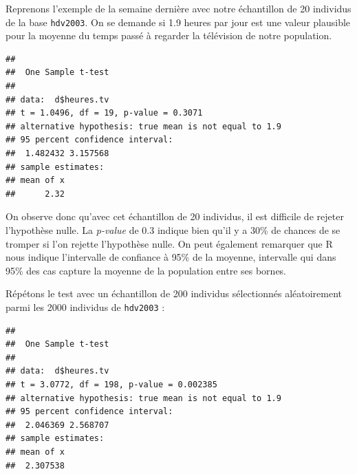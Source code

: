 \documentclass[
]{book}
\newenvironment{Shaded}{\begin{snugshade}}{\end{snugshade}}
\newcommand{\AttributeTok}[1]{\textcolor[rgb]{0.77,0.63,0.00}{#1}}
\newcommand{\FloatTok}[1]{\textcolor[rgb]{0.00,0.00,0.81}{#1}}
\newcommand{\FunctionTok}[1]{\textcolor[rgb]{0.00,0.00,0.00}{#1}}
\newcommand{\NormalTok}[1]{#1}
\newcommand{\OtherTok}[1]{\textcolor[rgb]{0.56,0.35,0.01}{#1}}
\newcommand{\SpecialCharTok}[1]{\textcolor[rgb]{0.00,0.00,0.00}{#1}}
\begin{document}
Reprenons l'exemple de la semaine dernière avec notre échantillon de 20 individus de la base \texttt{hdv2003}. On se demande si 1.9 heures par jour est une valeur plausible pour la moyenne du temps passé à regarder la télévision de notre population.

\begin{Shaded}
\end{Shaded}

\begin{verbatim}
## 
##  One Sample t-test
## 
## data:  d$heures.tv
## t = 1.0496, df = 19, p-value = 0.3071
## alternative hypothesis: true mean is not equal to 1.9
## 95 percent confidence interval:
##  1.482432 3.157568
## sample estimates:
## mean of x 
##      2.32
\end{verbatim}

On observe donc qu'avec cet échantillon de 20 individus, il est difficile de rejeter l'hypothèse nulle. La \emph{p-value} de 0.3 indique bien qu'il y a 30\% de chances de se tromper si l'on rejette l'hypothèse nulle. On peut également remarquer que R nous indique l'intervalle de confiance à 95\% de la moyenne, intervalle qui dans 95\% des cas capture la moyenne de la population entre ses bornes.

Répétons le test avec un échantillon de 200 individus sélectionnés aléatoirement parmi les 2000 individus de \texttt{hdv2003} :

\begin{Shaded}
\end{Shaded}

\begin{verbatim}
## 
##  One Sample t-test
## 
## data:  d$heures.tv
## t = 3.0772, df = 198, p-value = 0.002385
## alternative hypothesis: true mean is not equal to 1.9
## 95 percent confidence interval:
##  2.046369 2.568707
## sample estimates:
## mean of x 
##  2.307538
\end{verbatim}
\end{document}
